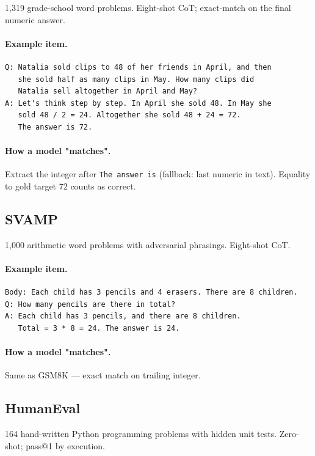 1{,}319 grade-school word problems. Eight-shot CoT; exact-match on
the final numeric answer.

\paragraph{Example item.}
\begin{verbatim}
Q: Natalia sold clips to 48 of her friends in April, and then
   she sold half as many clips in May. How many clips did
   Natalia sell altogether in April and May?
A: Let's think step by step. In April she sold 48. In May she
   sold 48 / 2 = 24. Altogether she sold 48 + 24 = 72.
   The answer is 72.
\end{verbatim}

\paragraph{How a model "matches".} Extract the integer after
\verb|The answer is| (fallback: last numeric in text). Equality to
gold target $72$ counts as correct.

\subsection{SVAMP}
\label{app:ex-svamp}

1{,}000 arithmetic word problems with adversarial phrasings.
Eight-shot CoT.

\paragraph{Example item.}
\begin{verbatim}
Body: Each child has 3 pencils and 4 erasers. There are 8 children.
Q: How many pencils are there in total?
A: Each child has 3 pencils, and there are 8 children.
   Total = 3 * 8 = 24. The answer is 24.
\end{verbatim}

\paragraph{How a model "matches".} Same as GSM8K — exact match on
trailing integer.

\subsection{HumanEval}
\label{app:ex-humaneval}

164 hand-written Python programming problems with hidden unit
tests. Zero-shot; pass@1 by execution.

